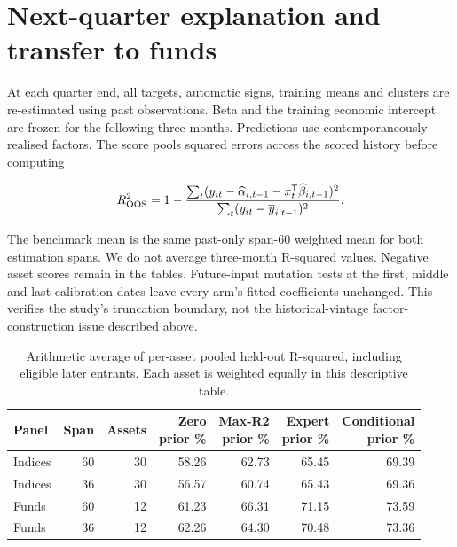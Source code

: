 \documentclass[a4paper,review]{cas-sc}
\begin{document}
\section{Next-quarter explanation and transfer to funds}

At each quarter end, all targets, automatic signs, training means and clusters are re-estimated using past observations. Beta and the training economic intercept are frozen for the following three months. Predictions use contemporaneously realised factors. The score pools squared errors across the scored history before computing

\begin{equation}
R^2_{\rm OOS}=1-\frac{\sum_t(y_{it}-\widehat\alpha_{i,t-1}-x_t^{\mathsf T}\widehat\beta_{i,t-1})^2}
{\sum_t(y_{it}-\overline y_{i,t-1})^2}.
\end{equation}

The benchmark mean is the same past-only span-60 weighted mean for both estimation spans. We do not average three-month R-squared values. Negative asset scores remain in the tables. Future-input mutation tests at the first, middle and last calibration dates leave every arm's fitted coefficients unchanged. This verifies the study's truncation boundary, not the historical-vintage factor-construction issue described above.

\begin{table}[pos=htbp]
\centering
\small
\caption{Arithmetic average of per-asset pooled held-out R-squared, including eligible later entrants. Each asset is weighted equally in this descriptive table.}
\begin{adjustbox}{max width=\linewidth}
\begin{tabular}{lrrrrrr}
\toprule
Panel & Span & Assets & \shortstack{Zero\\prior} \% & \shortstack{Max-R2\\prior} \% & \shortstack{Expert\\prior} \% & \shortstack{Conditional\\prior} \% \\
\midrule
Indices & 60 & 30 & 58.26 & 62.73 & 65.45 & 69.39 \\
Indices & 36 & 30 & 56.57 & 60.74 & 65.43 & 69.36 \\
Funds & 60 & 12 & 61.23 & 66.31 & 71.15 & 73.59 \\
Funds & 36 & 12 & 62.26 & 64.30 & 70.48 & 73.36 \\
\bottomrule
\end{tabular}
\end{adjustbox}
\end{table}
\end{document}
